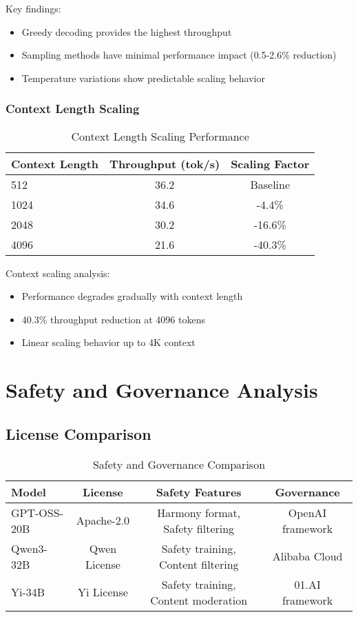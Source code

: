 \documentclass[11pt]{article}
\begin{document}
Key findings:
\begin{itemize}
    \item Greedy decoding provides the highest throughput
    \item Sampling methods have minimal performance impact (0.5-2.6\% reduction)
    \item Temperature variations show predictable scaling behavior
\end{itemize}

\subsubsection{Context Length Scaling}

\begin{table}[h]
\centering
\caption{Context Length Scaling Performance}
\begin{tabular}{lcc}
\toprule
Context Length & Throughput (tok/s) & Scaling Factor \\
\midrule
512 & 36.2 & Baseline \\
1024 & 34.6 & -4.4\% \\
2048 & 30.2 & -16.6\% \\
4096 & 21.6 & -40.3\% \\
\bottomrule
\end{tabular}
\end{table}

Context scaling analysis:
\begin{itemize}
    \item Performance degrades gradually with context length
    \item 40.3\% throughput reduction at 4096 tokens
    \item Linear scaling behavior up to 4K context
\end{itemize}

\section{Safety and Governance Analysis}

\subsection{License Comparison}

\begin{table}[h]
\centering
\caption{Safety and Governance Comparison}
\begin{tabular}{lccc}
\toprule
Model & License & Safety Features & Governance \\
\midrule
GPT-OSS-20B & Apache-2.0 & Harmony format, Safety filtering & OpenAI framework \\
Qwen3-32B & Qwen License & Safety training, Content filtering & Alibaba Cloud \\
Yi-34B & Yi License & Safety training, Content moderation & 01.AI framework \\
\bottomrule
\end{tabular}
\end{table}
\end{document}
